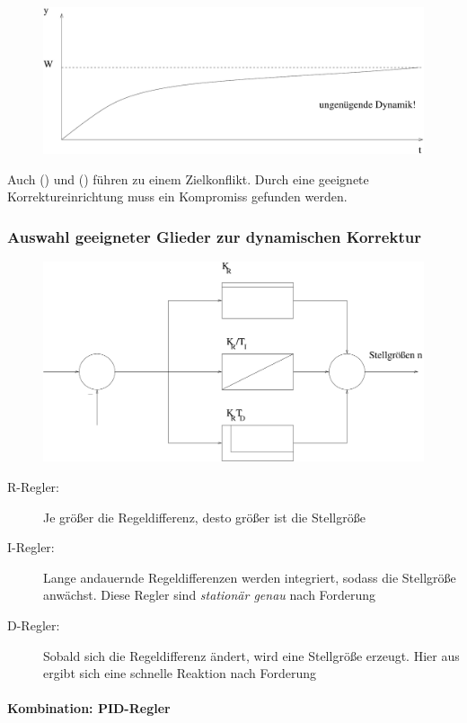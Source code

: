 \documentclass[12pt,a4paper,ngerman]{scrartcl}
\newcommand{\RM}[1]{\MakeUppercase{\romannumeral #1{.}}}
\begin{document}
\begin{itemize}
\begin{figure}[H]
    \centering
    \includegraphics[width=.7\linewidth]{sysregel_No_4}
  \end{figure}

\end{itemize}
Auch (\RM{3}) und (\RM{4}) führen zu einem Zielkonflikt. Durch eine geeignete Korrektureinrichtung muss ein Kompromiss gefunden werden.

\subsubsection{Auswahl geeigneter Glieder zur dynamischen Korrektur}
\begin{figure}[H]
  \centering
  \includegraphics[width=.7\linewidth]{sysregel_No_2}
\end{figure}


\begin{description}
\item[R-Regler:] Je größer die Regeldifferenz, desto größer ist die Stellgröße
\item[I-Regler:] Lange andauernde Regeldifferenzen werden integriert, sodass die Stellgröße anwächst. Diese Regler sind \emph{stationär genau} nach Forderung \RM{2}
\item[D-Regler:] Sobald sich die Regeldifferenz ändert, wird eine Stellgröße erzeugt. Hier aus ergibt sich eine schnelle Reaktion nach Forderung \RM{4} 
\end{description}

\paragraph{Kombination: PID-Regler}
\end{document}

